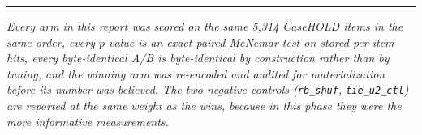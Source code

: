 \documentclass[11pt]{article}
\newcommand{\code}[1]{\texttt{#1}}
\begin{document}
\vspace{1.5em}
\begin{center}
{\color{dqblue}\rule{0.5\textwidth}{0.8pt}}
\end{center}
\vspace{0.5em}

{\small\itshape
Every arm in this report was scored on the same 5{,}314 CaseHOLD items in the same order, every
$p$-value is an exact paired McNemar test on stored per-item hits, every byte-identical A/B is
byte-identical by construction rather than by tuning, and the winning arm was re-encoded and
audited for materialization before its number was believed. The two negative controls
(\code{rb\_shuf}, \code{tie\_u2\_ctl}) are reported at the same weight as the wins, because in this
phase they were the more informative measurements.\par}
\end{document}
